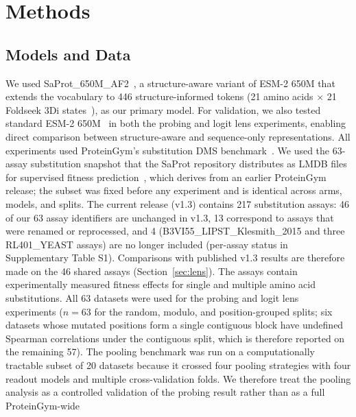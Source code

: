 \documentclass[11pt,a4paper]{article}
\newcommand{\revised}[1]{#1}
\newcommand{\rtwo}[1]{#1}
\newcommand{\rthree}[1]{#1}
\begin{document}
\section{Methods}

\subsection{Models and Data}

We used SaProt\_650M\_AF2~\cite{su2024saprot}, a structure-aware variant of ESM-2 650M
that extends the vocabulary to 446 structure-informed tokens (21 amino acids $\times$ 21
Foldseek 3Di states~\cite{vankempen2024foldseek}), as our primary model. For validation,
we also tested standard ESM-2 650M~\cite{lin2023evolutionary} in both the probing and
logit lens experiments, enabling direct comparison between structure-aware and
sequence-only representations. All experiments used ProteinGym's substitution DMS
benchmark~\cite{notin2024proteingym}. \rtwo{We used the 63-assay substitution snapshot
that the SaProt repository distributes as LMDB files for supervised fitness
prediction~\cite{su2024saprot}, which derives from an earlier ProteinGym release; the
subset was fixed before any experiment and is identical across arms, models, and
splits. The current release (v1.3) contains 217 substitution assays: 46 of our 63
assay identifiers are unchanged in v1.3, 13 correspond to assays that were renamed or
reprocessed, and 4 (B3VI55\_LIPST\_Klesmith\_2015 and three RL401\_YEAST assays) are
no longer included (per-assay status in Supplementary Table \rthree{S1}). Comparisons with
published v1.3 results are therefore made on the 46 shared assays
(Section~\ref{sec:lens}).} The assays contain experimentally measured fitness effects
for single and multiple amino acid substitutions. \revised{All 63 datasets
were used for the probing and logit lens experiments ($n = 63$ for the random, modulo, and
position-grouped splits; six datasets whose mutated positions form a single contiguous
block have undefined Spearman correlations under the contiguous split, which is therefore
reported on the remaining 57).} The pooling benchmark was run on a computationally tractable subset of
20 datasets because it crossed four pooling strategies with four readout models and
multiple cross-validation folds. We therefore treat the pooling analysis as a
controlled validation of the probing result rather than as a full ProteinGym-wide
\end{document}
